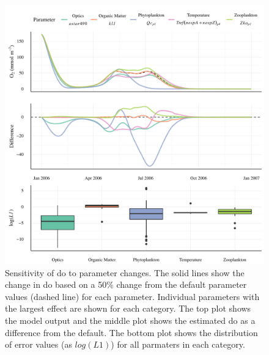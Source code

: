 \documentclass[letterpaper,12pt,oneside]{article}\usepackage[]{graphicx}\usepackage[]{color}
\makeatletter
\def\maxwidth{ %
  \ifdim\Gin@nat@width>\linewidth
    \linewidth
  \else
    \Gin@nat@width
  \fi
}
\makeatother
\begin{document}
\begin{figure}[!ht]

{\centering \includegraphics[width=\maxwidth]{figs/sensplo-1} 

}

\caption{Sensitivity of \ac{do} to parameter changes. The solid lines show the change in \ac{do} based on a 50\% change from the default parameter values (dashed line) for each parameter.  Individual parameters with the largest effect are shown for each category.  The top plot shows the model output and the middle plot shows the estimated \ac{do} as a difference from the default.  The bottom plot shows the distribution of error values (as $log\left(L1\right)$) for all parmaters in each category.}\label{fig:sensplo}
\end{figure}
\end{document}
